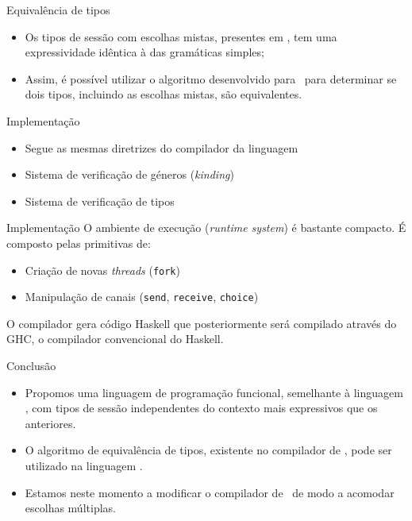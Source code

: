 \begin{frame}[fragile]{Equivalência de tipos}
  \begin{itemize}
  \item Os tipos de sessão com escolhas mistas, presentes em \mixedchoice,
    tem uma expressividade idêntica à das gramáticas simples;
    \pause
    \vspace{1cm}
  \item Assim, é possível utilizar o algoritmo desenvolvido para \freest$\,$
    para determinar se dois tipos, incluindo as escolhas mistas, são equivalentes.
\end{itemize}
\end{frame}

\begin{frame}[fragile]{Implementação}
  \begin{itemize}
  \item Segue as mesmas diretrizes do compilador da linguagem \freest
    \pause
    \vspace{1cm}
  \item Sistema de verificação de géneros (\textit{kinding})
    \pause
    \vspace{1cm}    
  \item Sistema de verificação de tipos
  \end{itemize}
\end{frame}

\begin{frame}[fragile]{Implementação}  
  O ambiente de execução (\textit{runtime system}) é bastante compacto.
  É composto pelas primitivas de:
  
  \begin{itemize}
  \item Criação de novas \textit{threads} (\lstinline|fork|)\pause
  \item Manipulação de canais (\lstinline|send|, \lstinline|receive|, \lstinline|choice|)
  \end{itemize}
\pause
\vspace{5mm}
O compilador gera código Haskell que posteriormente será compilado através do GHC, o compilador convencional do Haskell. 
\end{frame}

\begin{frame}[fragile]{Conclusão}
  \begin{itemize}
  \item Propomos uma linguagem de programação funcional, semelhante à linguagem \freest, com tipos de sessão independentes do contexto mais expressivos que os anteriores.
    \pause
    \vspace{1cm}
  \item O algoritmo de equivalência de tipos, existente no compilador de \freest, pode ser utilizado na linguagem \mixedchoice.
    \pause
    \vspace{1cm}    
  \item Estamos neste momento a modificar o compilador de
  \freest$\,$ de modo a acomodar escolhas múltiplas.  
  \end{itemize}
\end{frame}


